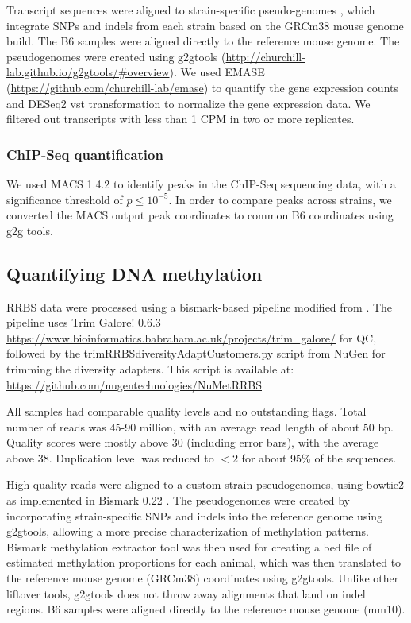 \documentclass[
  11pt,
]{article}
\begin{document}
Transcript sequences were aligned to strain-specific pseudo-genomes
\citep{pmid27309819}, which integrate SNPs and indels from each strain
based on the GRCm38 mouse genome build. The B6 samples were aligned
directly to the reference mouse genome. The pseudogenomes were created
using g2gtools
(\url{http://churchill-lab.github.io/g2gtools/#overview}). We used EMASE
(\url{https://github.com/churchill-lab/emase}) \citep{pmid29444201} to
quantify the gene expression counts and DESeq2 vst transformation
\citep{love2014moderated} to normalize the gene expression data. We
filtered out transcripts with less than 1 CPM in two or more replicates.

\hypertarget{chip-seq-quantification}{%
\subsubsection{ChIP-Seq quantification}\label{chip-seq-quantification}}

We used MACS 1.4.2 \citep{pmid18798982} to identify peaks in the
ChIP-Seq sequencing data, with a significance threshold of
\(p \leq 10^{-5}\). In order to compare peaks across strains, we
converted the MACS output peak coordinates to common B6 coordinates
using g2g tools.

\hypertarget{quantifying-dna-methylation}{%
\subsection{Quantifying DNA
methylation}\label{quantifying-dna-methylation}}

RRBS data were processed using a bismark-based pipeline modified from
\citep{pmid30348905}. The pipeline uses Trim Galore! 0.6.3
\url{https://www.bioinformatics.babraham.ac.uk/projects/trim_galore/}
for QC, followed by the trimRRBSdiversityAdaptCustomers.py script from
NuGen for trimming the diversity adapters. This script is available at:
\url{https://github.com/nugentechnologies/NuMetRRBS}

All samples had comparable quality levels and no outstanding flags.
Total number of reads was 45-90 million, with an average read length of
about 50 bp. Quality scores were mostly above 30 (including error bars),
with the average above 38. Duplication level was reduced to \(<2\) for
about 95\% of the sequences.

High quality reads were aligned to a custom strain pseudogenomes, using
bowtie2 as implemented in Bismark 0.22 \citep{pmid21493656}. The
pseudogenomes were created by incorporating strain-specific SNPs and
indels into the reference genome using g2gtools, allowing a more precise
characterization of methylation patterns. Bismark methylation extractor
tool was then used for creating a bed file of estimated methylation
proportions for each animal, which was then translated to the reference
mouse genome (GRCm38) coordinates using g2gtools. Unlike other liftover
tools, g2gtools does not throw away alignments that land on indel
regions. B6 samples were aligned directly to the reference mouse genome
(mm10).
\end{document}
